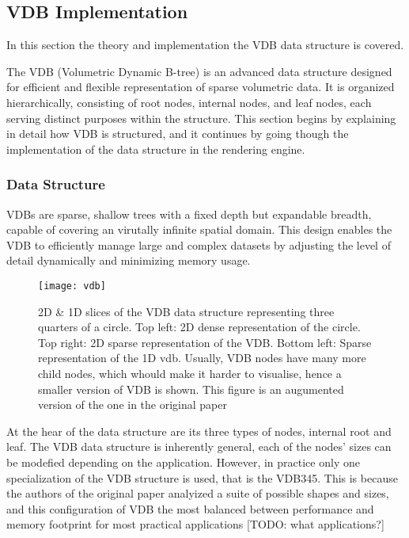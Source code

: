 \subsection{VDB Implementation}

In this section the theory and implementation the VDB data structure is covered.

The VDB (Volumetric Dynamic B-tree) is an advanced data structure designed for efficient and flexible representation of sparse volumetric data. It is organized hierarchically, consisting of root nodes, internal nodes, and leaf nodes, each serving distinct purposes within the structure. This section begins by explaining in detail how VDB is structured, and it continues by going though the implementation of the data structure in the rendering engine.

\subsubsection{Data Structure}
VDBs are sparse, shallow trees with a fixed depth but expandable breadth, capable of covering an virutally infinite spatial domain. This design enables the VDB to efficiently manage large and complex datasets by adjusting the level of detail dynamically and minimizing memory usage.

\begin{figure}[H]
  \centering
  \texttt{[image: vdb]}
  \caption{2D \& 1D slices of the VDB data structure representing three quarters of a circle. Top left: 2D dense representation of the circle. Top right: 2D sparse representation of the VDB. Bottom left: Sparse representation of the 1D vdb. Usually, VDB nodes have many more child nodes, which whould make it harder to visualise, hence a smaller version of VDB is shown. This figure is an augumented version of the one in the original paper\supercite{vdb2013}}
\end{figure}

At the hear of the data structure are its three types of nodes, internal root and leaf. The VDB data structure is inherently general, each of the nodes' sizes can be modefied depending on the application. However, in practice only one specialization of the VDB structure is used, that is the VDB345. This is because the authors of the original paper\supercite{vdb2013} analyized a suite of possible shapes and sizes, and this configuration of VDB the most balanced between performance and memory footprint for most practical applications [TODO: what applications?]

